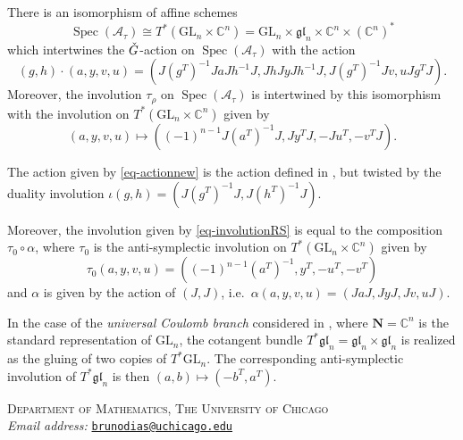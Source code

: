 \documentclass[11pt]{article}
\theoremstyle{definition}
\theoremstyle{plain}
\theoremstyle{remark}
\newcommand{\GL}{\mathrm{GL}}
\newcommand{\numberset}{\mathbb}
\newcommand{\C}{\numberset{C}}
\newcommand{\gl}{\mathfrak{gl}}
\DeclareMathOperator{\spec}{Spec}
\begin{document}
            \begin{corollary}
                There is an isomorphism of affine schemes
                \[
                    \spec(\mathcal{A}_\tau) \cong T^*(\GL_n \times \C^n) = \GL_n \times \gl_n \times \C^n \times (\C^n)^*
                \]
                which intertwines the $\Check{G}$-action on $\spec(\mathcal{A}_\tau)$ with the action 
                \begin{equation}\label{eq-actionnew}
                    (g,h) \cdot (a,y,v,u) = (J(g^T)^{-1}JaJh^{-1}J, JhJyJh^{-1}J, J(g^T)^{-1}Jv, uJg^TJ).
                \end{equation}                                
                Moreover, the involution $\tau_{\rho}$ on $\spec(\mathcal{A}_\tau)$ is intertwined by this isomorphism with the involution on $T^*(\GL_n \times \C^n)$ given by
                \begin{equation}\label{eq-involutionRS}
                    (a,y,v,u) \mapsto ((-1)^{n-1}J(a^T)^{-1}J, Jy^TJ, -Ju^T, -v^TJ).
                \end{equation}
            \end{corollary}

        \begin{rmk}
            The action given by \eqref{eq-actionnew} is the action defined in , but twisted by the duality involution $\iota(g,h) = (J(g^T)^{-1}J,J(h^T)^{-1}J)$.
            
            Moreover, the involution given by \eqref{eq-involutionRS} is equal to the composition $\tau_0 \circ \alpha$, where $\tau_0$ is the anti-symplectic involution on $T^*(\GL_n \times \C^n)$ given by
            \[
                \tau_0(a,y,v,u) = ((-1)^{n-1}(a^T)^{-1},y^T,-u^T,-v^T)
            \]
            and $\alpha$ is given by the action of $(J,J)$, i.e.\ $\alpha(a,y,v,u) = (JaJ,JyJ,Jv,uJ)$.
        \end{rmk}

        \begin{rmk}
            In the case of the \emph{universal Coulomb branch} considered in \cite[Section 3.3]{ginzburg2025pointwisepurityderivedsatake}, where $\mathbf{N} = \C^n$ is the standard representation of $\GL_n$, the cotangent bundle $T^*\gl_n = \gl_n \times \gl_n$ is realized as the gluing of two copies of $T^*\GL_n$. The corresponding anti-symplectic involution of $T^*\gl_n$ is then $(a,b) \mapsto (-b^T,a^T)$. 
        \end{rmk}
        
        \printbibliography
        \nocite{*}
        \small{\noindent
        \textsc{Department of Mathematics, The University of Chicago} \\
        \textit{Email address:} \texttt{\href{mailto:brunodias@uchicago.edu}{brunodias@uchicago.edu}}}
\end{document}
